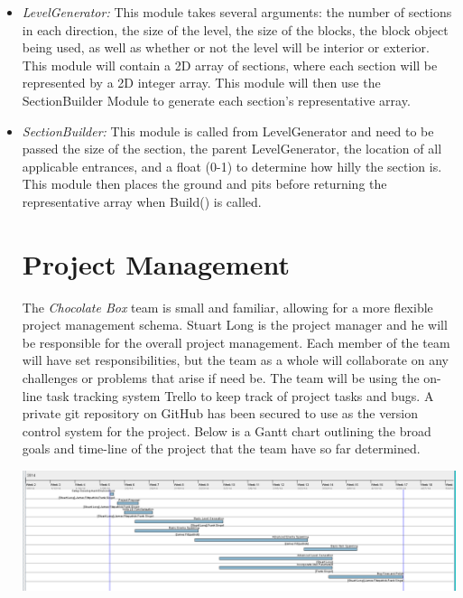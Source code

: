 \documentclass[pdftex,12pt,letter]{article}
\begin{document}
\begin{itemize}
\begin{itemize}
\begin{itemize}
\begin{itemize}
\item \textit{LevelGenerator:} This module takes several arguments: the number of sections in each direction, the size of the level, the size of the blocks, the block object being used, as well as whether or not the level will be interior or exterior. This module will contain a 2D array of sections, where each section will be represented by a 2D integer array. This module will then use the SectionBuilder Module to generate each section's representative array.

\item \textit{SectionBuilder:} This module is called from LevelGenerator and need to be passed the size of the section, the parent LevelGenerator, the location of all applicable entrances, and a float (0-1) to determine how hilly the section is. This module then places the ground and pits before returning the representative array when Build() is called.

\endgroup


\section{Project Management}
The \textit{Chocolate Box} team is small and familiar, allowing for a more flexible project management schema. Stuart Long is the project manager and he will be responsible for the overall project management. Each member of the team will have set responsibilities, but the team as a whole will collaborate on any challenges or problems that arise if need be. The team will be using the on-line task tracking system Trello to keep track of project tasks and bugs. A private git repository on GitHub has been secured to use as the version control system for the project. Below is a Gantt chart outlining the broad goals and time-line of the project that the team have so far determined.\\[.5cm]
\centerline{\includegraphics[width=7in]{GanttSS.png}}


\end{itemize}
\end{itemize}
\end{itemize}
\end{itemize}
\end{document}
